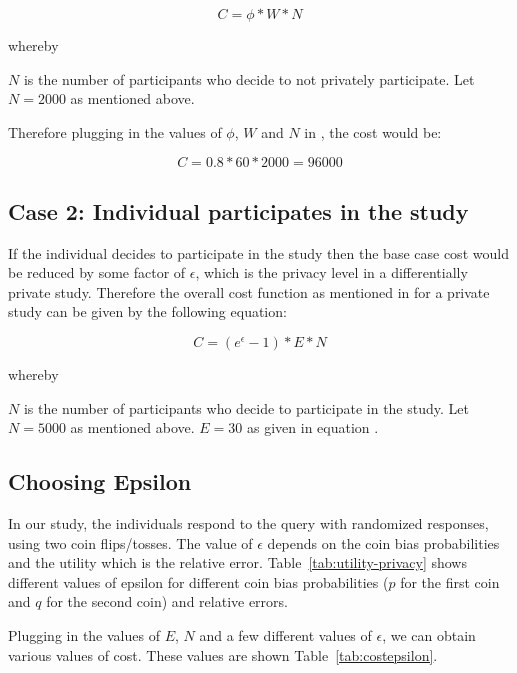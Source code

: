\documentclass[conference]{IEEEtran}
\begin{document}
\begin{equation}
C = \phi * W * N
\end{equation}

whereby

$N$ is the number of participants who decide to not privately participate. Let $N = 2000$ as mentioned above.

Therefore plugging in the values of $\phi$, $W$ and $N$ in \cite{DBLP:conf/csfw/HsuGHKNPR14}, the cost would be:

\begin{equation}
C = 0.8 * 60 * 2000 = 96000
\end{equation}

\subsection{Case 2: Individual participates in the study}

If the individual decides to participate in the study then the base case cost would be reduced by some factor of $\epsilon$, which is the privacy level in a differentially private study.  Therefore the overall cost function as mentioned in \cite{DBLP:conf/csfw/HsuGHKNPR14} for a private study can be given by the following equation:

\begin{equation}
C  = (e^\epsilon - 1) * E * N
\end{equation}

whereby

$N$ is the number of participants who decide to participate in the study. Let $N = 5000$ as mentioned above. 
$E = 30$ as given in equation \cite{DBLP:conf/csfw/HsuGHKNPR14}.



\subsection{Choosing Epsilon}

In our study, the individuals respond to the query with randomized responses, using two coin flips/tosses. The value of $\epsilon$ depends on the coin bias probabilities and the utility which is the relative error. Table~\ref{tab:utility-privacy} shows different values of epsilon for different coin bias probabilities ($p$ for the first coin and $q$ for the second coin) and relative errors.

Plugging in the values of $E$, $N$ and a few different values of $\epsilon$, we can obtain various values of cost. These values are shown Table~\ref{tab:costepsilon}.
\end{document}
